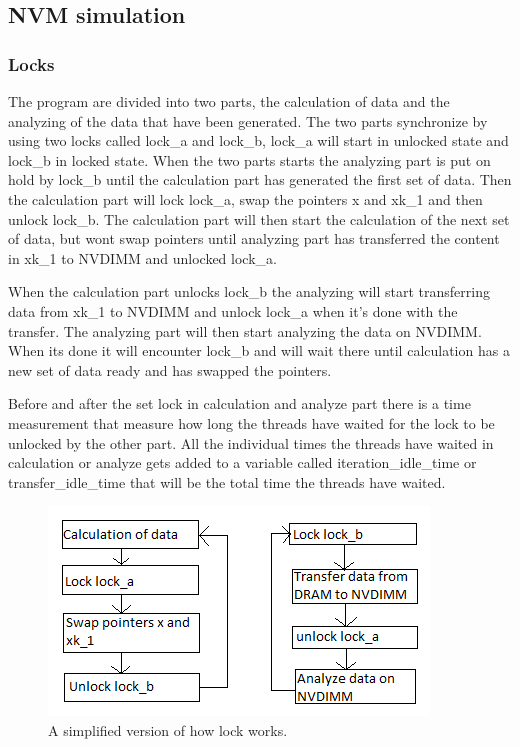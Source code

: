\documentclass[12pt,a4paper,USenglish]{article}      %
\begin{document}
\clearpage
\subsection{NVM simulation}
\subsubsection{Locks}
The program are divided into two parts, the calculation of data and the analyzing of the data that have been generated. The two parts synchronize by using two locks called lock\_a and lock\_b, lock\_a will start in unlocked state and lock\_b in locked state. When the two parts starts the analyzing part is put on hold by lock\_b until the calculation part has generated the first set of data. Then the calculation part will lock lock\_a, swap the pointers x and xk\_1 and then unlock lock\_b. The calculation part will then start the calculation of the next set of data, but wont swap pointers until analyzing part has transferred the content in xk\_1 to NVDIMM and unlocked lock\_a.

When the calculation part unlocks lock\_b the analyzing will start transferring data from xk\_1 to NVDIMM and unlock lock\_a when it's done with the transfer. The analyzing part will then start analyzing the data on NVDIMM. When its done it will encounter lock\_b and will wait there until calculation has a new set of data ready and has swapped the pointers.

Before and after the set lock in calculation and analyze part there is a time measurement that measure how long the threads have waited for the lock to be unlocked by the other part. All the individual times the threads have waited in calculation or analyze gets added to a variable called iteration\_idle\_time or transfer\_idle\_time that will be the total time the threads have waited. 

\begin{figure}[!hbtp]
\includegraphics[scale=1]{lock_overview.png}
\caption{A simplified version of how lock works.}
\end{figure}
\end{document}
